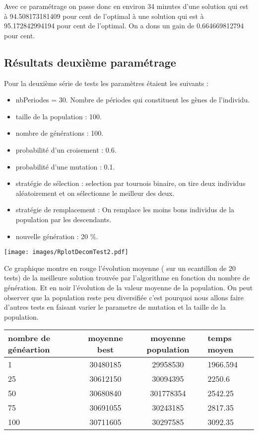 \documentclass[a4paper]{report}
\begin{document}
Avec ce paramétrage on passe donc en environ 34 minutes d'une solution qui est à 94.508173181409 pour cent de l'optimal à une solution qui est à 95.172842994194 pour cent de l'optimal. On a dons un gain de 0.664669812794 pour cent.
\subsection{Résultats deuxième paramétrage}
Pour la deuxième série de tests les paramètres étaient les suivants :\\

\begin{itemize}
\item nbPeriodes = 30. Nombre de périodes qui constituent les gènes de l'individu.
\item taille de la population : 100.
\item nombre de générations : 100.
\item probabilité d'un croisement : 0.6.
\item probabilité d'une mutation : 0.1.
\item stratégie de sélection : selection par tournois binaire, on tire deux individus aléatoirement et on sélectionne le meilleur des deux.
\item stratégie de remplacement : On remplace les moins bons individus de la population par les descendants.
\item nouvelle génération : 20 $\%$.

\end{itemize}
\begin{center}
\texttt{[image: images/RplotDecomTest2.pdf]}
\end{center}
Ce graphique montre en rouge l'évolution moyenne ( sur un ecantillon de 20 tests) de la  meilleure solution trouvée par l'algorithme en fonction du nombre de génération. Et en noir l'évolution de la valeur moyenne de la population. On peut observer que la population reste peu diversifiée c'est pourquoi nous allons faire d'autres tests en faisant varier le parametre de mutation et la taille de la population.\\
\begin{tabular}{|l|c|c|l|}
  \hline
  nombre de généartion &moyenne best &moyenne population&temps moyen\\

  \hline
 1 & 30480185&29958530&1966.594\\
  \hline
25 & 30612150 &30094395&  2250.6
\\
  \hline
  50& 30680840&301778354&2542.25
\\
  \hline
  75 &30691055&30243185&2817.35


\\
  \hline
 100 &  30711605&30297585& 3092.35 \\
  \hline


\end{tabular}
\end{document}
